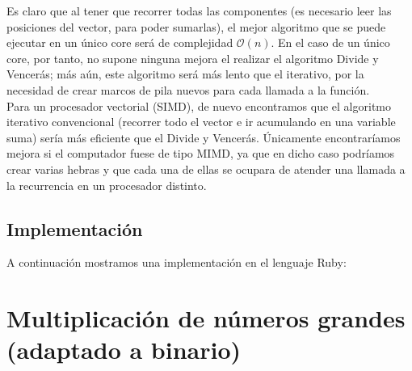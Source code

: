 \documentclass[a4paper, 11pt]{article} %
\begin{document}
Es claro que al tener que recorrer todas las componentes (es necesario leer las posiciones
del vector, para poder sumarlas), el mejor algoritmo que se puede ejecutar en un único core 
será de complejidad $\mathcal{O}(n)$. En el caso de un único core, por tanto, no supone ninguna
mejora el realizar el algoritmo Divide y Vencerás; más aún, este algoritmo será más lento que el
iterativo, por la necesidad de crear marcos de pila nuevos para cada llamada a la función.\\
Para un procesador vectorial (SIMD), de nuevo encontramos que el algoritmo iterativo convencional
(recorrer todo el vector e ir acumulando en una variable suma) sería más eficiente que el Divide y Vencerás.
Únicamente encontraríamos mejora si el computador fuese de tipo MIMD, ya que en dicho caso podríamos crear
varias hebras y que cada una de ellas se ocupara de atender una llamada a la recurrencia en un procesador distinto.

\subsection{Implementación}
A continuación mostramos una implementación en el lenguaje Ruby:

\small
\texttt{}
\normalsize

\section {Multiplicación de números grandes (adaptado a 
binario)}
\end{document}
